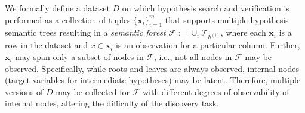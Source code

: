 

 We formally define a dataset $D$ on which hypothesis search and verification is performed as a collection of tuples $\{\mathbf{x}_i\}_{i=1}^m$ that 
supports
multiple hypothesis semantic trees
resulting in a \textit{semantic forest} $\mathcal{F}:=\cup_i\mathcal{T}_{h^{(i)}}$, where each $\mathbf{x}_i$ is a row in the dataset and $x \in \mathbf{x}_i$ is an observation for a particular column. Further, $\mathbf{x}_i$ may span only a subset of nodes in $\mathcal{F}$, i.e., not all nodes in $\mathcal{F}$ may be observed. 
Specifically, while roots and leaves are always observed, internal nodes (target variables for intermediate hypotheses) may be latent.
Therefore, multiple versions of $D$ may be collected for $\mathcal{F}$ with different degrees of observability of internal nodes, altering the difficulty of the discovery task.


